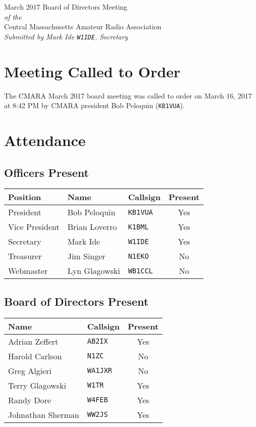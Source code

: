 \documentclass[10pt,letterpaper]{article}
\begin{document}
\begin{center}
{\huge March 2017 Board of Directors Meeting}\\
\emph{of the}\\
{\Large Central Massachusetts Amateur Radio Association}\\
\emph{Submitted by Mark Ide \texttt{W1IDE}, Secretary}
\end{center}

\section{Meeting Called to Order}
The CMARA March 2017 board meeting was called to order on March 16, 2017 at 8:42 PM by CMARA president Bob Peloquin (\texttt{KB1VUA}).

\section{Attendance}

\subsection{Officers Present}
\begin{tabular}{|l|l|l|c|}
  \hline
  \textbf{Position} & \textbf{Name}  & \textbf{Callsign} & \textbf{Present} \\ \hline
  President         & Bob Peloquin   & \texttt{KB1VUA}   & Yes \\
  Vice President    & Brian Loverro  & \texttt{K1BML}    & Yes \\
  Secretary         & Mark Ide       & \texttt{W1IDE}    & Yes \\
  Treasurer         & Jim Singer     & \texttt{N1EKO}    & No \\
  Webmaster         & Lyn Glagowski  & \texttt{WB1CCL}   & No \\
  \hline
\end{tabular}

\subsection{Board of Directors Present}
\begin{tabular}{|l|l|c|}
  \hline
  \textbf{Name}     & \textbf{Callsign} & \textbf{Present} \\ \hline
  Adrian Zeffert    & \texttt{AB2IX}    & Yes \\
  Harold Carlson    & \texttt{N1ZC}     & No \\
  Greg Algieri      & \texttt{WA1JXR}   & No \\
  Terry Glagowski   & \texttt{W1TR}     & Yes \\
  Randy Dore        & \texttt{W4FEB}    & Yes \\
  Johnathan Sherman & \texttt{WW2JS}    & Yes \\
  \hline
\end{tabular}
\end{document}

